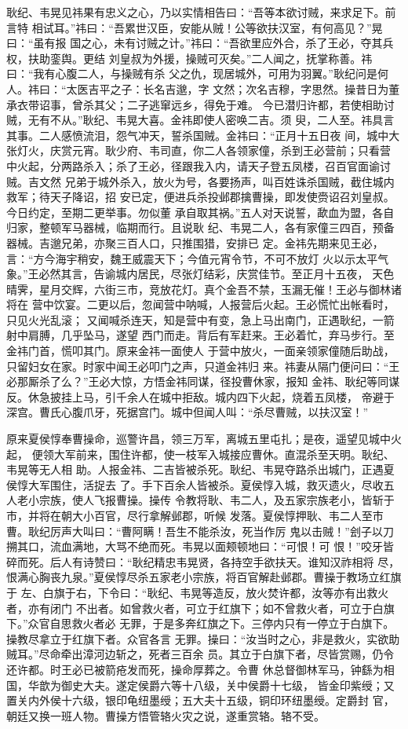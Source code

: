 耿纪、韦晃见祎果有忠义之心，乃以实情相告曰：“吾等本欲讨贼，来求足下。前言特
相试耳。”祎曰：“吾累世汉臣，安能从贼！公等欲扶汉室，有何高见？”晃曰：“虽有报
国之心，未有讨贼之计。”祎曰：“吾欲里应外合，杀了王必，夺其兵权，扶助銮舆。更结
刘皇叔为外援，操贼可灭矣。”二人闻之，抚掌称善。祎曰：“我有心腹二人，与操贼有杀
父之仇，现居城外，可用为羽翼。”耿纪问是何人。祎曰：“太医吉平之子：长名吉邈，字
文然；次名吉穆，字思然。操昔日为董承衣带诏事，曾杀其父；二子逃窜远乡，得免于难。
今已潜归许都，若使相助讨贼，无有不从。”耿纪、韦晃大喜。金祎即使人密唤二吉。须
臾，二人至。祎具言其事。二人感愤流泪，怨气冲天，誓杀国贼。金祎曰：“正月十五日夜
间，城中大张灯火，庆赏元宵。耿少府、韦司直，你二人各领家僮，杀到王必营前；只看营
中火起，分两路杀入；杀了王必，径跟我入内，请天子登五凤楼，召百官面谕讨贼。吉文然
兄弟于城外杀入，放火为号，各要扬声，叫百姓诛杀国贼，截住城内救军；待天子降诏，招
安已定，便进兵杀投邺郡擒曹操，即发使赍诏召刘皇叔。今日约定，至期二更举事。勿似董
承自取其祸。”五人对天说誓，歃血为盟，各自归家，整顿军马器械，临期而行。且说耿
纪、韦晃二人，各有家僮三四百，预备器械。吉邈兄弟，亦聚三百人口，只推围猎，安排已
定。金祎先期来见王必，言：“方今海宇稍安，魏王威震天下；今值元宵令节，不可不放灯
火以示太平气象。”王必然其言，告谕城内居民，尽张灯结彩，庆赏佳节。至正月十五夜，
天色晴霁，星月交辉，六街三市，竞放花灯。真个金吾不禁，玉漏无催！王必与御林诸将在
营中饮宴。二更以后，忽闻营中呐喊，人报营后火起。王必慌忙出帐看时，只见火光乱滚；
又闻喊杀连天，知是营中有变，急上马出南门，正遇耿纪，一箭射中肩膊，几乎坠马，遂望
西门而走。背后有军赶来。王必着忙，弃马步行。至金祎门首，慌叩其门。原来金祎一面使人
于营中放火，一面亲领家僮随后助战，只留妇女在家。时家中闻王必叩门之声，只道金祎归
来。祎妻从隔门便问曰：“王必那厮杀了么？”王必大惊，方悟金祎同谋，径投曹休家，报知
金祎、耿纪等同谋反。休急披挂上马，引千余人在城中拒敌。城内四下火起，烧着五凤楼，
帝避于深宫。曹氏心腹爪牙，死据宫门。城中但闻人叫：“杀尽曹贼，以扶汉室！”

原来夏侯惇奉曹操命，巡警许昌，领三万军，离城五里屯扎；是夜，遥望见城中火起，
便领大军前来，围住许都，使一枝军入城接应曹休。直混杀至天明。耿纪、韦晃等无人相
助。人报金祎、二吉皆被杀死。耿纪、韦晃夺路杀出城门，正遇夏侯惇大军围住，活捉去
了。手下百余人皆被杀。夏侯惇入城，救灭遗火，尽收五人老小宗族，使人飞报曹操。操传
令教将耿、韦二人，及五家宗族老小，皆斩于市，并将在朝大小百官，尽行拿解邺郡，听候
发落。夏侯惇押耿、韦二人至市曹。耿纪厉声大叫曰：“曹阿瞒！吾生不能杀汝，死当作厉
鬼以击贼！”刽子以刀搠其口，流血满地，大骂不绝而死。韦晃以面颊顿地曰：“可恨！可
恨！”咬牙皆碎而死。后人有诗赞曰：“耿纪精忠韦晃贤，各持空手欲扶天。谁知汉祚相将
尽，恨满心胸丧九泉。”夏侯惇尽杀五家老小宗族，将百官解赴邺郡。曹操于教场立红旗于
左、白旗于右，下令曰：“耿纪、韦晃等造反，放火焚许都，汝等亦有出救火者，亦有闭门
不出者。如曾救火者，可立于红旗下；如不曾救火者，可立于白旗下。”众官自思救火者必
无罪，于是多奔红旗之下。三停内只有一停立于白旗下。操教尽拿立于红旗下者。众官各言
无罪。操曰：“汝当时之心，非是救火，实欲助贼耳。”尽命牵出漳河边斩之，死者三百余
员。其立于白旗下者，尽皆赏赐，仍令还许都。时王必已被箭疮发而死，操命厚葬之。令曹
休总督御林军马，钟繇为相国，华歆为御史大夫。遂定侯爵六等十八级，关中侯爵十七级，
皆金印紫绶；又置关内外侯十六级，银印龟纽墨绶；五大夫十五级，铜印环纽墨绶。定爵封
官，朝廷又换一班人物。曹操方悟管辂火灾之说，遂重赏辂。辂不受。

